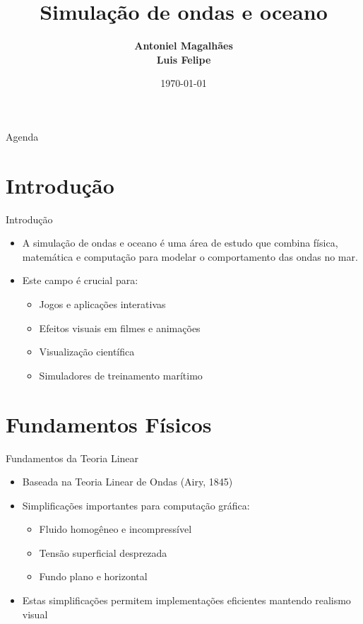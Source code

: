 \documentclass[aspectratio=169,xcolor=table]{beamer}
\author[Magalhães, Felipe]{%
  \textbf{Antoniel Magalhães} \\
  \textbf{Luis Felipe}
}
\title{Simulação de ondas e oceano}
\institute{Universidade Federal da Bahia \\ Instituto de Computação}
\date{\today}
\begin{document}
\begin{frame}
    \titlepage
\end{frame}

\begin{frame}{Agenda}
    \tableofcontents
\end{frame}

\setlength{\parskip}{1em} %

\section{Introdução}
\begin{frame}{Introdução}
    \begin{itemize}
        \item A simulação de ondas e oceano é uma área de estudo que combina física, matemática e computação para modelar o comportamento das ondas no mar.
        \item Este campo é crucial para:
        \begin{itemize}
            \item Jogos e aplicações interativas
            \item Efeitos visuais em filmes e animações
            \item Visualização científica
            \item Simuladores de treinamento marítimo
        \end{itemize}
    \end{itemize}
\end{frame}

\section{Fundamentos Físicos}
\begin{frame}{Fundamentos da Teoria Linear}
    \begin{itemize}
        \item Baseada na Teoria Linear de Ondas (Airy, 1845)
        \item Simplificações importantes para computação gráfica:
        \begin{itemize}
            \item Fluido homogêneo e incompressível
            \item Tensão superficial desprezada
            \item Fundo plano e horizontal
        \end{itemize}
        \item Estas simplificações permitem implementações eficientes mantendo realismo visual \cite{meirelles2007modelagem}
    \end{itemize}
\end{frame}
\end{document}
